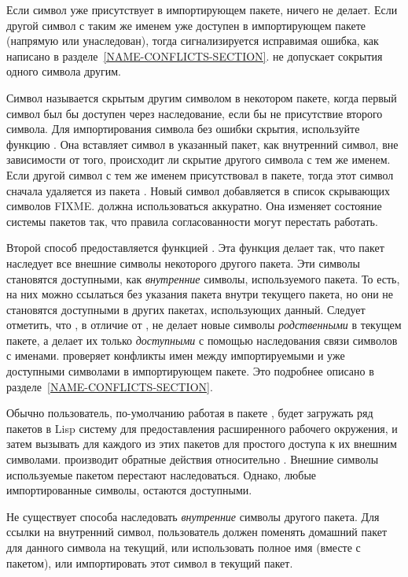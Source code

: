 Если символ уже присутствует в импортирующем пакете, 
ничего не делает. Если другой символ с таким же именем 
уже доступен в импортирующем пакете (напрямую или унаследован), тогда
сигнализируется исправимая ошибка, как написано в
разделе~\ref{NAME-CONFLICTS-SECTION}.  не допускает
сокрытия одного символа другим.

Символ называется скрытым другим символом в некотором пакете, когда первый
символ был бы доступен через наследование, если бы не присутствие второго
символа.
Для импортирования символа без ошибки скрытия, используйте функцию
. Она вставляет символ в указанный пакет, как внутренний
символ, вне зависимости от того, происходит ли скрытие другого символа с тем же
именем.
Если другой символ с тем же именем присутствовал в пакете, тогда этот символ
сначала удаляется из пакета . Новый символ добавляется в список
скрывающих символов FIXME.  должна использоваться
аккуратно. Она изменяет состояние системы пакетов так, что правила согласованности
могут перестать работать.

Второй способ предоставляется функцией . Эта функция делает
так, что пакет наследует все внешние символы некоторого другого пакета. Эти
символы становятся доступными, как \emph{внутренние} символы, используемого
пакета. То есть, на них можно ссылаться без указания пакета внутри текущего
пакета, но они не становятся доступными в других пакетах, использующих
данный. Следует отметить, что , в отличие от , не
делает новые символы \emph{родственными} в текущем пакете, а делает их только
\emph{доступными} с помощью наследования связи символов с именами.
 проверяет конфликты имен между импортируемыми и уже доступными
символами в импортирующем пакете. Это подробнее описано в
разделе~\ref{NAME-CONFLICTS-SECTION}.

Обычно пользователь, по-умолчанию работая в пакете
, будет загружать ряд пакетов в Lisp систему для
предоставления расширенного рабочего окружения, и затем вызывать
 для каждого из этих пакетов для простого доступа к
их внешним символами.  производит обратные
действия относительно . Внешние символы используемые
пакетом перестают наследоваться. Однако, любые импортированные
символы, остаются доступными.

Не существует способа наследовать \emph{внутренние} символы другого пакета. Для
ссылки на внутренний символ, пользователь должен поменять домашний пакет для
данного символа на текущий, или использовать полное имя (вместе с пакетом), или
импортировать этот символ в текущий пакет.

